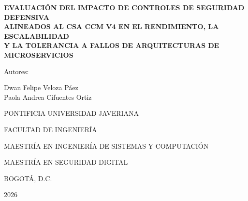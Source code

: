 \documentclass[12pt,letterpaper,fleqn]{report}
\begin{document}
\begin{titlepage}
    \centering
    \vspace*{1cm}

    {\large\bfseries EVALUACIÓN DEL IMPACTO DE CONTROLES DE SEGURIDAD DEFENSIVA \\
    ALINEADOS AL CSA CCM V4 EN EL RENDIMIENTO, LA ESCALABILIDAD \\
    Y LA TOLERANCIA A FALLOS DE ARQUITECTURAS DE MICROSERVICIOS\par}

    \vspace{3cm}

    {\large Autores:\par}
    \vspace{0.5cm}
    {\large Dwan Felipe Veloza Páez\\
    Paola Andrea Cifuentes Ortiz\par}

    \vfill

    {\large PONTIFICIA UNIVERSIDAD JAVERIANA\par}
    {\large FACULTAD DE INGENIERÍA\par}
    {\large MAESTRÍA EN INGENIERÍA DE SISTEMAS Y COMPUTACIÓN\par}
    {\large MAESTRÍA EN SEGURIDAD DIGITAL\par}
    {\large BOGOTÁ, D.C.\par}
    {\large 2026\par}

\end{titlepage}
\end{document}
